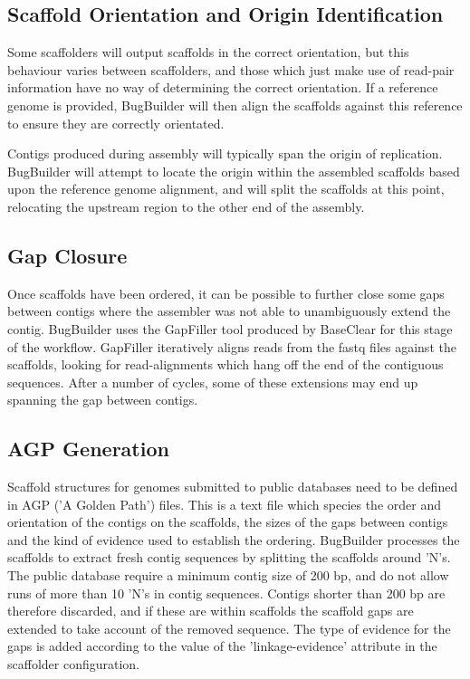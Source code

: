 \documentclass[a4paper,twoside,10pt]{article}
\begin{document}
\subsection{Scaffold Orientation and Origin Identification}

Some scaffolders will output scaffolds in the correct orientation, but this behaviour varies
between scaffolders, and those which just make use of read-pair information have no way of
determining the correct orientation. If a reference genome is provided, BugBuilder will then align
the scaffolds against this reference to ensure they are correctly orientated. 

Contigs produced during assembly will typically span the origin of replication. BugBuilder will
attempt to locate the origin within the assembled scaffolds based upon the reference genome
alignment, and will split the scaffolds at this point, relocating the upstream region to the other
end of the assembly.

\subsection{Gap Closure}

Once scaffolds have been ordered, it can be possible to further close some gaps between contigs
where the assembler was not able to unambiguously extend the contig. BugBuilder uses the GapFiller
tool produced by BaseClear for this stage of the workflow. GapFiller iteratively aligns reads from
the fastq files against the scaffolds, looking for read-alignments which hang off the end
of the contiguous sequences. After a number of cycles, some of these extensions may end up
spanning the gap between contigs.

\subsection{AGP Generation}

Scaffold structures for genomes submitted to public databases need to be defined in AGP ('A Golden
Path') files. This is a text file which species the order and orientation of the contigs on the
scaffolds, the sizes of the gaps between contigs and the kind of evidence used to establish the
ordering.  BugBuilder processes the scaffolds to extract fresh contig sequences by splitting the
scaffolds around 'N's. The public database require a minimum contig size of 200 bp, and do not
allow runs of more than 10 'N's in contig sequences. Contigs shorter than 200 bp are therefore
discarded, and if these are within scaffolds the scaffold gaps are extended to take account of the
removed sequence.  The type of evidence for the gaps is added according to the value of the
'linkage-evidence' attribute in the  scaffolder configuration.
\end{document}

